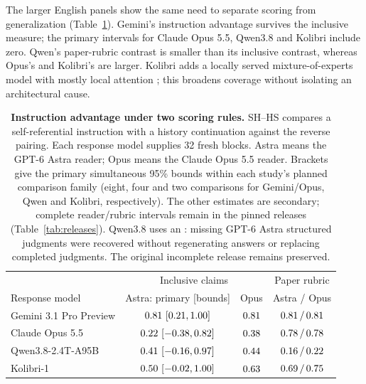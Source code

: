 The larger English panels show the same need to separate scoring from
generalization (Table~\ref{tab:model-comparison}). Gemini's instruction
advantage survives the inclusive measure; the primary intervals for
Claude Opus 5.5, Qwen3.8 and Kolibri include zero. Qwen's paper-rubric
contrast is smaller than its inclusive contrast, whereas Opus's and
Kolibri's are larger. Kolibri adds a locally served mixture-of-experts
model with mostly local attention \citep{alephalpha2026kolibri}; this
broadens coverage without isolating an architectural cause.

\begin{table}[!htbp]
\centering\small
\setlength{\tabcolsep}{4pt}
\caption{\textbf{Instruction advantage under two scoring rules.}
SH--HS compares a self-referential instruction with a history continuation
against the reverse pairing. Each response model supplies 32 fresh blocks.
Astra means the GPT-6 Astra reader; Opus means the Claude Opus 5.5 reader.
Brackets give the primary simultaneous 95\% bounds within each study's
planned comparison family (eight, four and two comparisons for Gemini/Opus,
Qwen and Kolibri, respectively). The other estimates are secondary;
complete reader/rubric intervals remain in the pinned releases
(Table~\ref{tab:releases}). Qwen3.8 uses an
:
\QEXRecovered{} missing GPT-6 Astra structured judgments were recovered
without regenerating answers or replacing completed judgments. The original
incomplete release remains preserved.}
\label{tab:model-comparison}
\begin{tabularx}{\linewidth}{@{}Xccc@{}}
\toprule
& \multicolumn{2}{c}{Inclusive claims} & Paper rubric\\
Response model & Astra: primary [bounds] & Opus & Astra / Opus\\
\midrule
Gemini 3.1 Pro Preview
 & $\ORSGeminiAstraInclusiveEffect{}\ \ORSGeminiAstraInclusiveCI{}$
 & $0.81{}$
 & $0.81{}\,/\,0.81{}$\\
Claude Opus 5.5
 & $\ORSOpusAstraInclusiveEffect{}\ \ORSOpusAstraInclusiveCI{}$
 & $0.38{}$
 & $0.78{}\,/\,0.78{}$\\
Qwen3.8-2.4T-A95B
 & $\QEXAstraInclusiveSwap{}\ \QEXAstraInclusiveSwapCI{}$
 & $0.44{}$
 & $0.16{}\,/\,0.22{}$\\
Kolibri-1
 & $\KEXMainAstraInclusiveSHHSCompleteEstimate{}\ \KEXPrimaryAstraInclusiveSHHSBounds{}$
 & $0.63{}$
 & $0.69{}\,/\,0.75{}$\\
\bottomrule
\end{tabularx}
\end{table}

